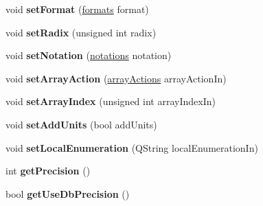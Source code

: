 \begin{DoxyCompactItemize}
\item 
\hypertarget{classQEStringFormatting_aa9bc244b4bee97ef9eb09950e1afa1b7}{
void {\bfseries setFormat} (\hyperlink{classQEStringFormatting_a41b4737442692b41d12b78c036cf9e56}{formats} format)}
\label{classQEStringFormatting_aa9bc244b4bee97ef9eb09950e1afa1b7}

\item 
\hypertarget{classQEStringFormatting_a93d8f03846702aaaf4860ec22ec0467b}{
void {\bfseries setRadix} (unsigned int radix)}
\label{classQEStringFormatting_a93d8f03846702aaaf4860ec22ec0467b}

\item 
\hypertarget{classQEStringFormatting_af97b719f7a3a210cd8304318875c735e}{
void {\bfseries setNotation} (\hyperlink{classQEStringFormatting_adfa7fa261e196d1327d4da6e046dbd84}{notations} notation)}
\label{classQEStringFormatting_af97b719f7a3a210cd8304318875c735e}

\item 
\hypertarget{classQEStringFormatting_a248ad161ad1dea43414841738bf8dd04}{
void {\bfseries setArrayAction} (\hyperlink{classQEStringFormatting_a36b424886bc64cea8f7ed69b2b03c0b9}{arrayActions} arrayActionIn)}
\label{classQEStringFormatting_a248ad161ad1dea43414841738bf8dd04}

\item 
\hypertarget{classQEStringFormatting_a11b8161872a1a4fb93b66eb2ce9dcf7c}{
void {\bfseries setArrayIndex} (unsigned int arrayIndexIn)}
\label{classQEStringFormatting_a11b8161872a1a4fb93b66eb2ce9dcf7c}

\item 
\hypertarget{classQEStringFormatting_aef85c1412b693d45e8a334d64f20798c}{
void {\bfseries setAddUnits} (bool addUnits)}
\label{classQEStringFormatting_aef85c1412b693d45e8a334d64f20798c}

\item 
\hypertarget{classQEStringFormatting_a252b76f186b99eeea0c21c5f73198e3b}{
void {\bfseries setLocalEnumeration} (QString localEnumerationIn)}
\label{classQEStringFormatting_a252b76f186b99eeea0c21c5f73198e3b}

\item 
\hypertarget{classQEStringFormatting_a5f3f151098bc12799642c5152458edb2}{
int {\bfseries getPrecision} ()}
\label{classQEStringFormatting_a5f3f151098bc12799642c5152458edb2}

\item 
\hypertarget{classQEStringFormatting_a8ede6127aa3e8b4569331110c92cd1f8}{
bool {\bfseries getUseDbPrecision} ()}
\label{classQEStringFormatting_a8ede6127aa3e8b4569331110c92cd1f8}


\end{DoxyCompactItemize}
